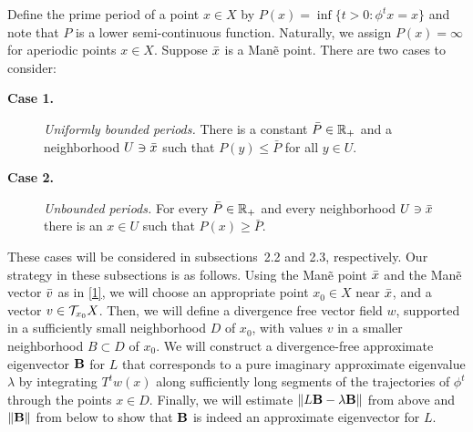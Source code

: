 Define the prime period of a point $x\in X$ by
$P(x) = \inf \{ t> 0: \phi^t x =x\}$ and note that $P$ is a lower
semi-continuous function. Naturally, we assign $P(x)=\infty$ for
aperiodic points $x\in X$.
Suppose ${\bar x}$ is a Man\~e point.
There are two cases to consider:
\begin{description}
\item[\bf Case 1.] {\it Uniformly bounded periods.}
There is a constant $\bar{P}\in{\Bbb{R}}_+$ and a
neighborhood $U\ni {\bar x}$ such that $P(y)\leq \bar{P}$ for all $y\in U$.
\item[\bf Case 2.] {\it Unbounded periods.}
 For every $\bar{P}\in{\Bbb{R}}_+$ and every neighborhood $U\ni {\bar x}$
there is an $x\in U$ such that $P(x)\geq \bar{P}$.
\end{description}
These cases will be considered in subsections~2.2 and 2.3, respectively.
Our strategy in these subsections is as follows. 
Using the Man\~e point ${\bar x}$ and the Man\~e vector ${\bar v}$ as in 
\eqref{1}, we  will choose an appropriate
point $x_0\in X$ near ${\bar x}$, and a vector $v\in{\cal{T}}_{x_0}X$.
Then, we will define a divergence free vector field $w$, supported in a
sufficiently small neighborhood $D$ of $x_0$, with values $v$
in a smaller neighborhood $B\subset D$ of $x_0$. 
We will construct  a divergence-free
approximate eigenvector ${\bold B}$ for $L$ that  corresponds to a pure
imaginary approximate eigenvalue $\lambda$ by integrating
$T^tw(x)$ along sufficiently 
long  segments of the trajectories of $\phi^t$
through the points $x\in D$. Finally, we will estimate 
$\|L{\bold B}-\lambda{\bold B}\|$
from above and $\|{\bold B}\|$ from below to show that ${\bold B}$ is indeed
an approximate eigenvector for $L$.

